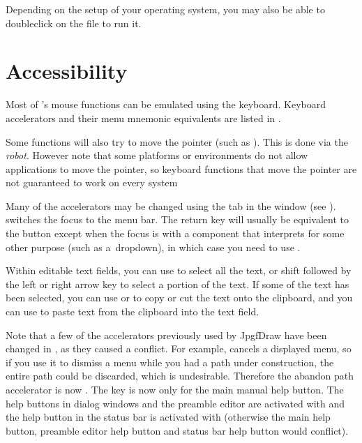 Depending on the setup of your operating system, you may also be
able to \gls{doubleclick} on the  file to run it.


\chapter{Accessibility}
\label{sec:access}

Most of \FlowframTk's mouse functions can be emulated using the
keyboard. Keyboard accelerators and
their menu mnemonic equivalents are listed in .

\begin{information}
Some functions will also try to move the pointer (such as
). This is done via the \emph{\gls{robot}}.
However note that some platforms or environments do not allow applications
to move the pointer, so keyboard functions that move the pointer are
not guaranteed to work on every system
\end{information}

Many of the accelerators may be changed using the 
tab in the  window (see
).  
switches the focus to the menu bar. The return 
key will usually be equivalent to the  button
except when the focus is with a component that interprets
 for some other purpose (such as
a~\gls{dropdown}), in which case you need to use .

Within editable text fields, you can use  to
select all the text, or shift  followed by
the left  or right  arrow
key to select a portion of the text. If some of the text has been
selected, you can use  or
 to copy or cut the text onto the clipboard,
and you can use  to paste text from the
clipboard into the text field.

\begin{warning}
Note that a few of the accelerators previously used by \gls{JpgfDraw} have
been changed in \FlowframTk, as they caused a conflict. For example,
 cancels a displayed menu, so if you use it to
dismiss a menu while you had a \gls{path} under construction, the
entire path could be discarded, which is undesirable. Therefore the
abandon path accelerator is now . The
 key is now only for the main manual help
button. The help buttons in dialog windows and the preamble editor
are activated with  and the help button in the
status bar is activated with  (otherwise
the main help button, preamble editor help button and status bar
help button would conflict).
\end{warning}

